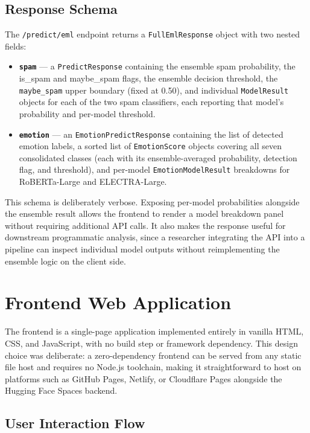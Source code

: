 \subsection{Response Schema}

The \texttt{/predict/eml} endpoint returns a \texttt{FullEmlResponse} object with two nested fields:

\begin{itemize}
    \item \textbf{\texttt{spam}} — a \texttt{PredictResponse} containing the ensemble spam probability, the is\_spam and maybe\_spam flags, the ensemble decision threshold, the \texttt{maybe\_spam} upper boundary (fixed at 0.50), and individual \texttt{ModelResult} objects for each of the two spam classifiers, each reporting that model's probability and per-model threshold.

    \item \textbf{\texttt{emotion}} — an \texttt{EmotionPredictResponse} containing the list of detected emotion labels, a sorted list of \texttt{EmotionScore} objects covering all seven consolidated classes (each with its ensemble-averaged probability, detection flag, and threshold), and per-model \texttt{EmotionModelResult} breakdowns for \acs{RoBERTa}-Large and \acs{ELECTRA}-Large.
\end{itemize}

This schema is deliberately verbose. Exposing per-model probabilities alongside the ensemble result allows the frontend to render a model breakdown panel without requiring additional \ac{API} calls. It also makes the response useful for downstream programmatic analysis, since a researcher integrating the \ac{API} into a pipeline can inspect individual model outputs without reimplementing the ensemble logic on the client side.

\section{Frontend Web Application}

The frontend is a single-page application implemented entirely in vanilla \ac{HTML}, CSS, and JavaScript, with no build step or framework dependency. This design choice was deliberate: a zero-dependency frontend can be served from any static file host and requires no Node.js toolchain, making it straightforward to host on platforms such as GitHub Pages, Netlify, or Cloudflare Pages alongside the Hugging Face Spaces backend.

\subsection{User Interaction Flow}

